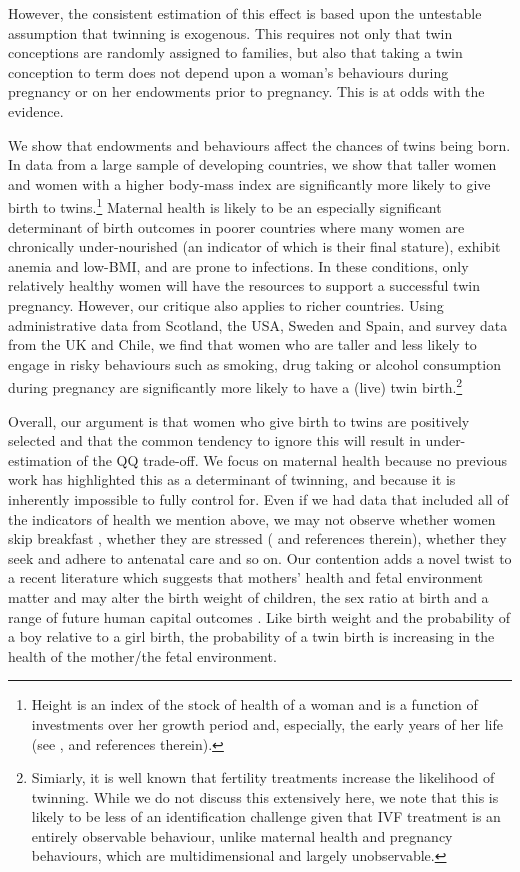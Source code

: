 However, the consistent estimation of this effect is based upon the untestable 
assumption that twinning is exogenous. This requires not only that twin 
conceptions are randomly assigned to families, but also that taking a twin
conception to term does not depend upon a woman's behaviours during pregnancy 
or on her endowments prior to pregnancy. This is at odds with the evidence.

We show that endowments and behaviours affect the chances of twins being born. 
In data from a large sample of developing countries, we show that taller women 
and women with a higher body-mass index are significantly more likely to give 
birth to twins.\footnote{Height is an index of the stock of health of a woman 
and is a function of investments over her growth period and, especially, the 
early years of her life (see \citet{BhalotraRawlings2013}, and references 
therein).} Maternal health is likely to be an especially significant determinant 
of birth outcomes in poorer countries where many women are chronically 
under-nourished (an indicator of which is their final stature), exhibit anemia 
and low-BMI, and are prone to infections. In these conditions, only relatively 
healthy women will have the resources to support a successful twin pregnancy. 
However, our critique also applies to richer countries. Using administrative 
data from Scotland, the USA, Sweden and Spain, and survey data from the UK and 
Chile, we find that women who are taller and less likely to engage in risky 
behaviours such as smoking, drug taking or alcohol consumption during pregnancy 
are significantly more likely to have a (live) twin birth.\footnote{Simiarly, 
it is well known that fertility treatments increase the likelihood of twinning.
While we do not discuss this extensively here, we note that this is likely to 
be less of an identification challenge given that IVF treatment is an entirely 
observable behaviour, unlike maternal health and pregnancy behaviours, which are
multidimensional and largely unobservable.}

Overall, our argument is that women who give birth to twins are positively 
selected and that the common tendency to ignore this will result in under-%
estimation of the QQ trade-off. We focus on maternal health because no 
previous work has highlighted this as a determinant of twinning, and because it 
is inherently impossible to fully control for. Even if we had data that included 
all of the indicators of health we mention above, we may not observe whether 
women skip breakfast \citep{MazumderSeeskin2014}, whether they are stressed 
(\citet{Blacketal2014} and references therein), whether they seek and adhere to 
antenatal care and so on. Our contention adds a novel twist to a recent 
literature which suggests that mothers' health and fetal environment matter and 
may alter the birth weight of children, the sex ratio at birth and a range of 
future human capital outcomes \citep{Almondetal2011,BhalotraRawlings2013,
Barker1995}. Like birth weight and the probability of a boy relative to a girl 
birth, the probability of a twin birth is increasing in the health of the 
mother/the fetal environment.

